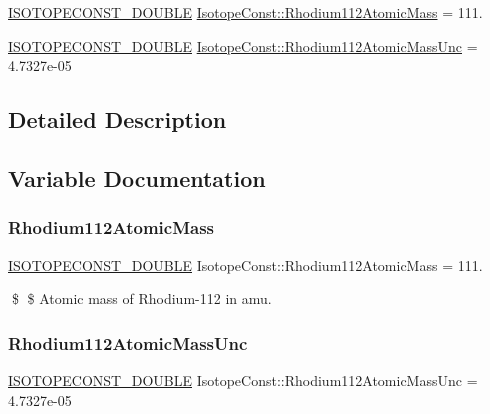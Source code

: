 \begin{DoxyCompactItemize}
\item 
\mbox{\hyperlink{group___isotope_const-_macros_ga8f45a7272ce02c0b4c65c44636ed719a}{I\+S\+O\+T\+O\+P\+E\+C\+O\+N\+S\+T\+\_\+\+D\+O\+U\+B\+LE}} \mbox{\hyperlink{group___isotope_const-_rhodium-_rh112_ga38b03182998e2ce8d416373d6d832d67}{Isotope\+Const\+::\+Rhodium112\+Atomic\+Mass}} = 111.
\item 
\mbox{\hyperlink{group___isotope_const-_macros_ga8f45a7272ce02c0b4c65c44636ed719a}{I\+S\+O\+T\+O\+P\+E\+C\+O\+N\+S\+T\+\_\+\+D\+O\+U\+B\+LE}} \mbox{\hyperlink{group___isotope_const-_rhodium-_rh112_ga0e48915ee52c2a0fc82c093b6a1ef3fe}{Isotope\+Const\+::\+Rhodium112\+Atomic\+Mass\+Unc}} = 4.\+7327e-\/05
\end{DoxyCompactItemize}


\subsection{Detailed Description}


\subsection{Variable Documentation}
\mbox{\label{group___isotope_const-_rhodium-_rh112_ga38b03182998e2ce8d416373d6d832d67}} 
\subsubsection{\texorpdfstring{Rhodium112\+Atomic\+Mass}{Rhodium112AtomicMass}}
{\footnotesize\ttfamily \mbox{\hyperlink{group___isotope_const-_macros_ga8f45a7272ce02c0b4c65c44636ed719a}{I\+S\+O\+T\+O\+P\+E\+C\+O\+N\+S\+T\+\_\+\+D\+O\+U\+B\+LE}} Isotope\+Const\+::\+Rhodium112\+Atomic\+Mass = 111.}

\$ \$ Atomic mass of Rhodium-\/112 in amu. \mbox{\label{group___isotope_const-_rhodium-_rh112_ga0e48915ee52c2a0fc82c093b6a1ef3fe}} 
\subsubsection{\texorpdfstring{Rhodium112\+Atomic\+Mass\+Unc}{Rhodium112AtomicMassUnc}}
{\footnotesize\ttfamily \mbox{\hyperlink{group___isotope_const-_macros_ga8f45a7272ce02c0b4c65c44636ed719a}{I\+S\+O\+T\+O\+P\+E\+C\+O\+N\+S\+T\+\_\+\+D\+O\+U\+B\+LE}} Isotope\+Const\+::\+Rhodium112\+Atomic\+Mass\+Unc = 4.\+7327e-\/05}

